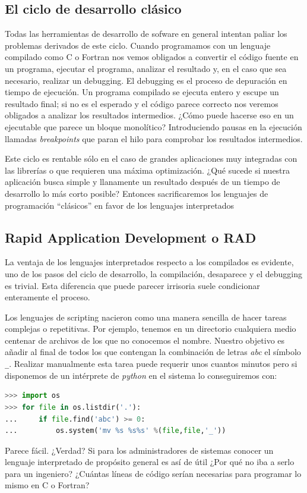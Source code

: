 \subsection{El ciclo de desarrollo clásico}

Todas las herramientas de desarrollo de sofware en general intentan
paliar los problemas derivados de este ciclo. Cuando programamos con
un lenguaje compilado como C o Fortran nos vemos obligados a convertir
el código fuente en un programa, ejecutar el programa, analizar el
resultado y, en el caso que sea necesario, realizar un debugging.  El
debugging es el proceso de depuración en tiempo de ejecución. Un
programa compilado se ejecuta entero y escupe un resultado final; si
no es el esperado y el código parece correcto nos veremos obligados a
analizar los resultados intermedios. ¿Cómo puede hacerse eso en un
ejecutable que parece un bloque monolítico? Introduciendo pausas en la
ejecución llamadas \emph{breakpoints} que paran el hilo para comprobar
los resultados intermedios.

Este ciclo es rentable sólo en el caso de grandes aplicaciones muy
integradas con las librerías o que requieren una máxima optimización.
¿Qué sucede si nuestra aplicación busca simple y llanamente un
resultado después de un tiempo de desarrollo lo más corto posible?
Entonces sacrificaremos los lenguajes de programación {}``clásicos''
en favor de los lenguajes interpretados


\subsection{Rapid Application Development o RAD}

La ventaja de los lenguajes interpretados respecto a los compilados es
evidente, uno de los pasos del ciclo de desarrollo, la compilación,
desaparece y el debugging es trivial. Esta diferencia que puede
parecer irrisoria suele condicionar enteramente el proceso.

Los lenguajes de scripting nacieron como una manera sencilla de hacer
tareas complejas o repetitivas. Por ejemplo, tenemos en un directorio
cualquiera medio centenar de archivos de los que no conocemos el nombre.
Nuestro objetivo es añadir al final de todos los que contengan la
combinación de letras \emph{abc} el símbolo \texttt{\_}. Realizar
manualmente esta tarea puede requerir unos cuantos minutos pero si
disponemos de un intérprete de \emph{python} en el sistema lo
conseguiremos con:

\begin{lstlisting}[language=Python]
>>> import os
>>> for file in os.listdir('.'):
...     if file.find('abc') >= 0:
...         os.system('mv %s %s%s' %(file,file,'_'))
\end{lstlisting}
Parece fácil. ¿Verdad? Si para los administradores de sistemas
conocer un lenguaje interpretado de propósito general es así de útil
¿Por qué no iba a serlo para un ingeniero? ¿Cuántas líneas de código
serían necesarias para programar lo mismo en C o Fortran?

